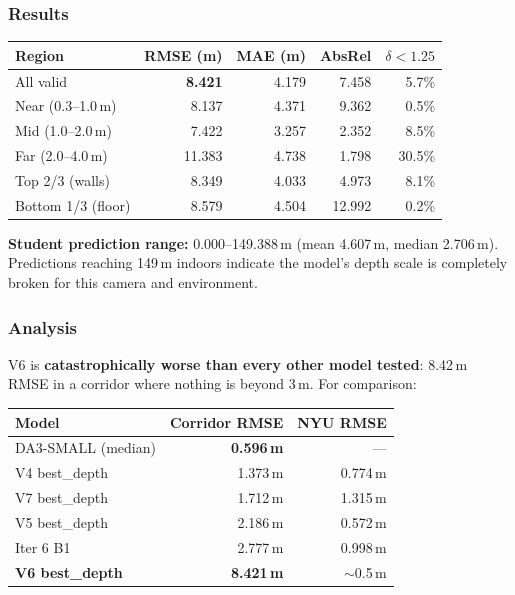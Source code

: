 \documentclass[11pt,a4paper]{article}
\begin{document}
\subsubsection{Results}

\begin{longtable}{lrrrr}
\toprule
\textbf{Region} & \textbf{RMSE (m)} & \textbf{MAE (m)} & \textbf{AbsRel} & \textbf{$\delta < 1.25$} \\
\midrule
\endfirsthead
All valid          & \textcolor{regression}{\textbf{8.421}} & 4.179 & 7.458 &  5.7\% \\
Near (0.3--1.0\,m) & 8.137 & 4.371 & 9.362 &  0.5\% \\
Mid (1.0--2.0\,m)  & 7.422 & 3.257 & 2.352 &  8.5\% \\
Far (2.0--4.0\,m)  & 11.383 & 4.738 & 1.798 & 30.5\% \\
Top 2/3 (walls)    & 8.349 & 4.033 & 4.973 &  8.1\% \\
Bottom 1/3 (floor) & 8.579 & 4.504 & 12.992 &  0.2\% \\
\bottomrule
\end{longtable}

\textbf{Student prediction range:} 0.000--149.388\,m (mean 4.607\,m, median
2.706\,m). Predictions reaching 149\,m indoors indicate the model's depth
scale is completely broken for this camera and environment.

\subsubsection{Analysis}

V6 is \textbf{catastrophically worse than every other model tested}:
8.42\,m RMSE in a corridor where nothing is beyond 3\,m. For comparison:

\begin{longtable}{lrr}
\toprule
\textbf{Model} & \textbf{Corridor RMSE} & \textbf{NYU RMSE} \\
\midrule
\endfirsthead
DA3-SMALL (median)   & \textcolor{improved}{\textbf{0.596\,m}} & --- \\
V4 best\_depth       & 1.373\,m & 0.774\,m \\
V7 best\_depth       & 1.712\,m & 1.315\,m \\
V5 best\_depth       & 2.186\,m & 0.572\,m \\
Iter 6 B1            & 2.777\,m & 0.998\,m \\
\textbf{V6 best\_depth} & \textcolor{regression}{\textbf{8.421\,m}} & $\sim$0.5\,m \\
\bottomrule
\end{longtable}
\end{document}
